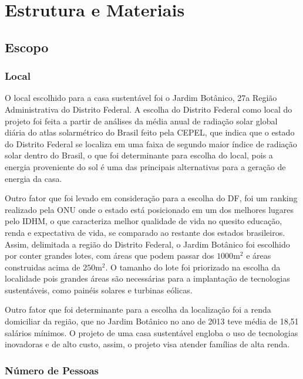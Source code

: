 \chapter{Estrutura e Materiais}

\section{Escopo}

\subsection{Local}

	O local escolhido para a casa sustentável foi o Jardim Botânico, 27a Região Administrativa do Distrito Federal. A escolha do Distrito Federal como local do projeto foi feita a partir de análises da média anual de radiação solar global diária do atlas solarmétrico do Brasil feito pela CEPEL, que indica que o estado do Distrito Federal se localiza em uma faixa de segundo maior índice de radiação solar dentro do Brasil, o que foi determinante para escolha do local, pois a energia proveniente do sol é uma das principais alternativas para a geração de energia da casa.
	
	Outro fator que foi levado em consideração para a escolha do DF, foi um ranking realizado pela ONU onde o estado está posicionado em um dos melhores lugares pelo IDHM, o que caracteriza melhor qualidade de vida no quesito educação, renda e expectativa de vida, se comparado ao restante dos estados brasileiros. Assim, delimitada a região do Distrito Federal, o Jardim Botânico foi escolhido por conter grandes lotes, com áreas que podem passar dos $1000\si{\meter}^{2}$\cite{2010Terracap} e áreas construidas acima de $250\si{\meter}^{2}$\cite{2014Codeplan}. O tamanho do lote foi priorizado na escolha da localidade pois grandes áreas são necessárias para a implantação de tecnologias sustentáveis, como painéis solares e turbinas eólicas.
	
	Outro fator que foi determinante para a escolha da localização foi a renda domiciliar da região, que no Jardim Botânico no ano de 2013 teve média de 18,51 salários mínimos\cite{2013SeplanCodeplan}. O projeto de uma casa sustentável engloba o uso de tecnologias inovadoras e de alto custo, assim, o projeto visa atender famílias de alta renda.
	
\subsection{Número de Pessoas}

